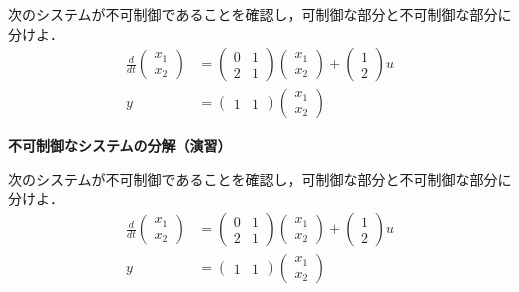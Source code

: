 \documentclass[a4paper,11pt,fleqn]{jreport}
\begin{document}
次のシステムが不可制御であることを確認し，可制御な部分と不可制御な部分に分けよ．\begin{align*}
	\frac{d}{dt}
	\left (
	\begin{array}{c}
	 x_1 \\ x_2 
	\end{array}
	\right )
	& = 
	\left (
	\begin{array}{cc}
	 0 & 1 \\
	 2 & 1
	\end{array}
	\right )
	\left (
	\begin{array}{c}
	 x_1 \\ x_2 
	\end{array}
	\right )
	+
	\left (
	\begin{array}{c}
	 1 \\ 2 
	\end{array}
	\right )
	u
\\
	y 
	&=
	\left (
	\begin{array}{cc}
	 1 & 1  
	\end{array}
	\right )
	\left (
	\begin{array}{c}
	 x_1 \\ x_2 
	\end{array}
	\right )
\end{align*}

\newpage

\noindent
{\bf 不可制御なシステムの分解（演習）}

次のシステムが不可制御であることを確認し，可制御な部分と不可制御な部分に分けよ．\begin{align*}
	\frac{d}{dt}
	\left (
	\begin{array}{c}
	 x_1 \\ x_2 
	\end{array}
	\right )
	& = 
	\left (
	\begin{array}{cc}
	 0 & 1 \\
	 2 & 1
	\end{array}
	\right )
	\left (
	\begin{array}{c}
	 x_1 \\ x_2 
	\end{array}
	\right )
	+
	\left (
	\begin{array}{c}
	 1 \\ 2 
	\end{array}
	\right )
	u
\\
	y 
	&=
	\left (
	\begin{array}{cc}
	 1 & 1  
	\end{array}
	\right )
	\left (
	\begin{array}{c}
	 x_1 \\ x_2 
	\end{array}
	\right )
\end{align*}
\end{document}
